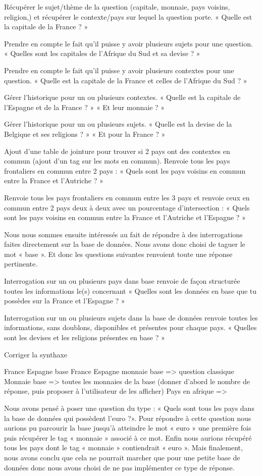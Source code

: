 \documentclass[11pt,a4paper]{article}
\begin{document}
 
Récupérer le sujet/thème de la question (capitale, monnaie, pays voisins, religion,) et récupérer le contexte/pays sur lequel la question porte.
« Quelle est la capitale de la France ? » 
 
Prendre en compte le fait qu’il puisse y avoir plusieurs sujets pour une question.
« Quelles sont les capitales de l’Afrique du Sud et sa devise ? »
 
Prendre en compte le fait qu’il puisse y avoir plusieurs contextes pour une question.
« Quelle est la capitale de la France et celles de l’Afrique du Sud ? »
 
Gérer l’historique pour un ou plusieurs contextes.
« Quelle est la capitale de l’Espagne et de la France ? »
« Et leur monnaie ? »
 
Gérer l’historique pour un ou plusieurs sujets.
« Quelle est la devise de la Belgique et ses religions ? »
« Et pour la France ? »
 
Ajout d’une table de jointure pour trouver si 2 pays ont des contextes en commun (ajout d’un tag sur les mots en commun). Renvoie tous les pays frontaliers en commun entre 2 pays :
« Quels sont les pays voisins en commun entre la France et l’Autriche ? »
 
Renvoie tous les pays frontaliers en commun entre les 3 pays et renvoie ceux en commun entre 2 pays deux à deux avec un pourcentage d’intersection :
« Quels sont les pays voisins en commun entre la France et l’Autriche et l’Espagne ? »
 
 
Nous nous sommes ensuite intéressés au fait de répondre à des interrogations faites directement sur la base de données. Nous avons donc choisi de taguer le mot « base ». Et donc les questions suivantes renvoient toute une réponse pertinente.
 
Interrogation sur un ou plusieurs pays dans base renvoie de façon structurée toutes les informations le(s) concernant
« Quelles sont les données en base que tu possèdes sur la France et l’Espagne ? »
 
Interrogation sur un ou plusieurs sujets dans la base de données renvoie toutes les informations, sans doublons, disponibles et présentes pour chaque pays.
« Quelles sont les devises et les religions présentes en base ? »
 
 
 
 
Corriger la synthaxe
 
France Espagne base
France Espagne monnaie base => question classique
Monnaie base => toutes les monnaies de la base  (donner d’abord le nombre de réponse, puis proposer à l’utilisateur de les afficher)
Pays en afrique =>
 
Nous avons pensé à poser une question du type : «  Quels sont tous les pays dans la base de données qui possèdent l’euro ?». Pour répondre à cette question nous aurions pu parcourir la base jusqu’à atteindre le mot « euro » une première fois puis  récupérer le tag « monnaie » associé à ce mot. Enfin nous aurions récupéré tous les pays dont le tag « monnaie » contiendrait « euro ». Mais finalement, nous avons conclu que cela ne pourrait marcher que pour une petite base de données donc nous avons choisi de ne pas implémenter ce type de réponse. 
\end{document}
